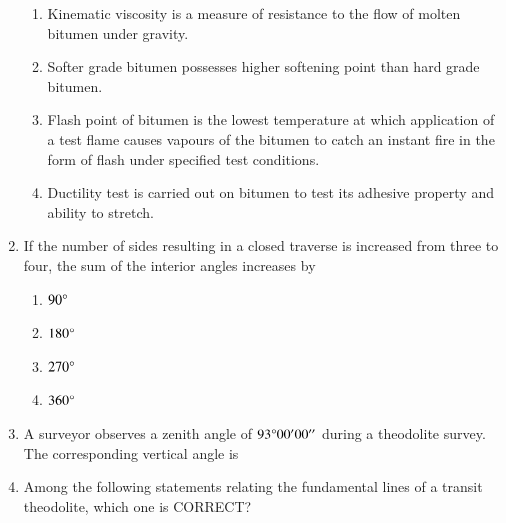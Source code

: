 \documentclass[journal,12pt,onecolumn]{article}
\theoremstyle{remark}
\begin{document}
\begin{enumerate}
    \hfill{}
    \begin{enumerate}
        \item Kinematic viscosity is a measure of resistance to the flow of molten bitumen under gravity.
        \item Softer grade bitumen possesses higher softening point than hard grade bitumen.
        \item Flash point of bitumen is the lowest temperature at which application of a test flame causes vapours of the bitumen to catch an instant fire in the form of flash under specified test conditions.
        \item Ductility test is carried out on bitumen to test its adhesive property and ability to stretch.
    \end{enumerate}

    \item If the number of sides resulting in a closed traverse is increased from three to four, the sum of the interior angles increases by
    
    \hfill{}
    \begin{enumerate}
        \item $90\degree$
        \item $180\degree$
        \item $270\degree$
        \item $360\degree$
    \end{enumerate}

    \item A surveyor observes a zenith angle of $93\degree 00' 00''$ during a theodolite survey. The corresponding vertical angle is
    
    \hfill{}
    \begin{enumerate}
    \end{enumerate}

    \item Among the following statements relating the fundamental lines of a transit theodolite, which one is CORRECT?
    

\end{enumerate}
\end{document}
